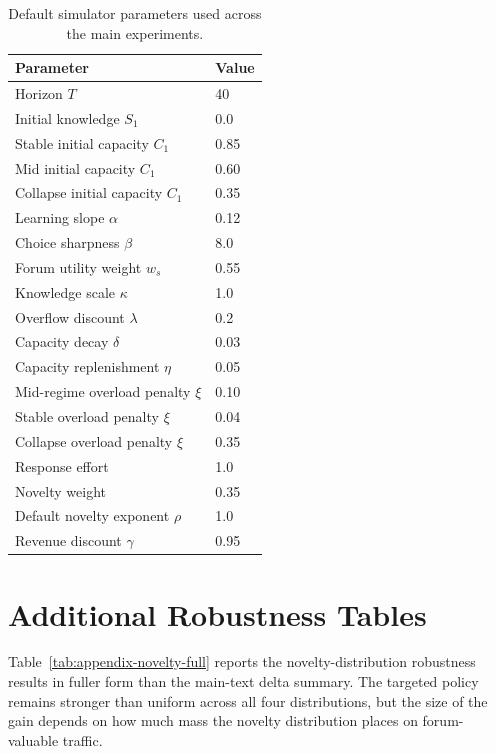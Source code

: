 \documentclass{article}
\begin{document}
\begin{table}[H]
\centering
\caption{Default simulator parameters used across the main experiments.}
\label{tab:appendix-params}
\begin{tabular}{ll}
\toprule
Parameter & Value \\
\midrule
Horizon $T$ & 40 \\
Initial knowledge $S_1$ & 0.0 \\
Stable initial capacity $C_1$ & 0.85 \\
Mid initial capacity $C_1$ & 0.60 \\
Collapse initial capacity $C_1$ & 0.35 \\
Learning slope $\alpha$ & 0.12 \\
Choice sharpness $\beta$ & 8.0 \\
Forum utility weight $w_s$ & 0.55 \\
Knowledge scale $\kappa$ & 1.0 \\
Overflow discount $\lambda$ & 0.2 \\
Capacity decay $\delta$ & 0.03 \\
Capacity replenishment $\eta$ & 0.05 \\
Mid-regime overload penalty $\xi$ & 0.10 \\
Stable overload penalty $\xi$ & 0.04 \\
Collapse overload penalty $\xi$ & 0.35 \\
Response effort & 1.0 \\
Novelty weight & 0.35 \\
Default novelty exponent $\rho$ & 1.0 \\
Revenue discount $\gamma$ & 0.95 \\
\bottomrule
\end{tabular}
\end{table}

\section{Additional Robustness Tables}
Table~\ref{tab:appendix-novelty-full} reports the novelty-distribution robustness results in fuller form than the main-text delta summary. The targeted policy remains stronger than uniform across all four distributions, but the size of the gain depends on how much mass the novelty distribution places on forum-valuable traffic.
\end{document}
